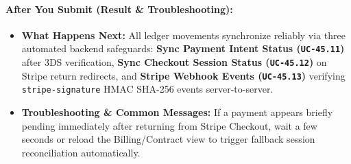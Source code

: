 \paragraph{After You Submit (Result \& Troubleshooting):}
\begin{itemize}[leftmargin=1.5em,itemsep=2pt]
  \item \textbf{What Happens Next:} All ledger movements synchronize reliably via three automated backend safeguards: \textbf{Sync Payment Intent Status (\texttt{UC-45.11})} after 3DS verification, \textbf{Sync Checkout Session Status (\texttt{UC-45.12})} on Stripe return redirects, and \textbf{Stripe Webhook Events (\texttt{UC-45.13})} verifying \texttt{stripe-signature} HMAC SHA-256 events server-to-server.
  \item \textbf{Troubleshooting \& Common Messages:} If a payment appears briefly pending immediately after returning from Stripe Checkout, wait a few seconds or reload the Billing/Contract view to trigger fallback session reconciliation automatically.
\end{itemize}
